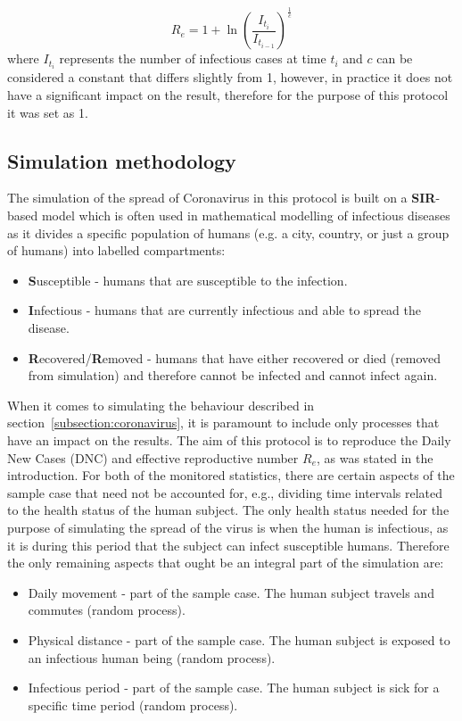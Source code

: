 \documentclass[a4paper]{article}
\begin{document}
\begin{equation}
	R_e = 1 + \ln\left(\frac{I_{t_i}}{I_{t_{i-1}}}\right)^\frac{1}{c}
	\label{equation:effective-reproductive-number}
\end{equation}
\noindent
where $I_{t_i}$ represents the number of infectious cases at time $t_i$ and $c$ can be considered a constant that differs slightly from 1, however, in practice it does not have a significant impact on the result, therefore for the purpose of this protocol it was set as 1.



\subsection{Simulation methodology}\label{subsection:simulation-methodology}
The simulation of the spread of Coronavirus in this protocol is built on a \textbf{SIR}-based model which is often used in mathematical modelling of infectious diseases as it divides a specific population of humans (e.g. a city, country, or just a group of humans) into labelled compartments:
\begin{itemize}
	\item \textbf{S}usceptible - humans that are susceptible to the infection.
	\item \textbf{I}nfectious - humans that are currently infectious and able to spread the disease.
	\item \textbf{R}ecovered/\textbf{R}emoved - humans that have either recovered or died (removed from simulation) and therefore cannot be infected and cannot infect again. 
\end{itemize}

When it comes to simulating the behaviour described in section~\ref{subsection:coronavirus}, it is paramount to include only processes that have an impact on the results. The aim of this protocol is to reproduce the Daily New Cases (DNC) and effective reproductive number $R_e$, as was stated in the introduction. For both of the monitored statistics, there are certain aspects of the sample case that need not be accounted for, e.g., dividing time intervals related to the health status of the human subject. The only health status needed for the purpose of simulating the spread of the virus is when the human is infectious, as it is during this period that the subject can infect susceptible humans. Therefore the only remaining aspects that ought be an integral part of the simulation are:
\begin{itemize}
	\item Daily movement -  part of the sample case. The human subject travels and commutes (random process).
	\item Physical distance -  part of the sample case. The human subject is exposed to an infectious human being (random process).
	\item Infectious period -  part of the sample case. The human subject is sick for a specific time period (random process).
\end{itemize}
\end{document}
